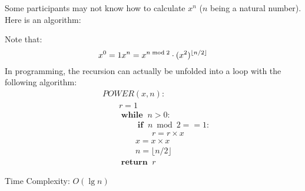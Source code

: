 Some participants may not know how to calculate $x^n$ ($n$ being a natural number). Here is an algorithm:

Note that:
$$
x^0 = 1\\
x^n = x^{n \bmod 2} \cdot (x^2)^{\lfloor n / 2 \rfloor}
$$
In programming, the recursion can actually be unfolded into a loop with the following algorithm:
$$
\begin{aligned}
& POWER(x, n):\\
& \hspace{2em}   r = 1\\
& \hspace{2em}   \boldsymbol{\operatorname{while }}\; n > 0:\\
& \hspace{4em}       \boldsymbol{\operatorname{if }}\; n \bmod 2 == 1:\\
& \hspace{6em}           r = r \times x\\
& \hspace{4em}       x = x \times x\\
& \hspace{4em}       n = \lfloor n / 2 \rfloor\\
& \hspace{2em}   \boldsymbol{\operatorname{return }}\; r
\end{aligned}
$$


Time Complexity: $O(\lg n)$
